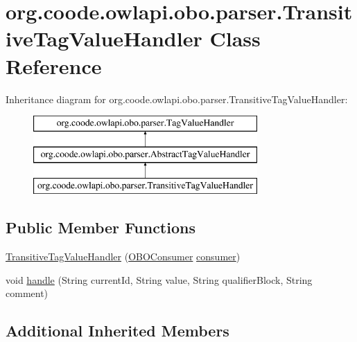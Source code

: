 \hypertarget{classorg_1_1coode_1_1owlapi_1_1obo_1_1parser_1_1_transitive_tag_value_handler}{\section{org.\-coode.\-owlapi.\-obo.\-parser.\-Transitive\-Tag\-Value\-Handler Class Reference}
\label{classorg_1_1coode_1_1owlapi_1_1obo_1_1parser_1_1_transitive_tag_value_handler}
}
Inheritance diagram for org.\-coode.\-owlapi.\-obo.\-parser.\-Transitive\-Tag\-Value\-Handler\-:\begin{figure}[H]
\begin{center}
\leavevmode
\includegraphics[height=3.000000cm]{classorg_1_1coode_1_1owlapi_1_1obo_1_1parser_1_1_transitive_tag_value_handler}
\end{center}
\end{figure}
\subsection*{Public Member Functions}
\begin{DoxyCompactItemize}
\item 
\hyperlink{classorg_1_1coode_1_1owlapi_1_1obo_1_1parser_1_1_transitive_tag_value_handler_a426d4cb0d40fc251f19bee9bec173ab2}{Transitive\-Tag\-Value\-Handler} (\hyperlink{classorg_1_1coode_1_1owlapi_1_1obo_1_1parser_1_1_o_b_o_consumer}{O\-B\-O\-Consumer} \hyperlink{classorg_1_1coode_1_1owlapi_1_1obo_1_1parser_1_1_abstract_tag_value_handler_ab27f1ff22d15640c5f81585f18265137}{consumer})
\item 
void \hyperlink{classorg_1_1coode_1_1owlapi_1_1obo_1_1parser_1_1_transitive_tag_value_handler_ace95c091ba188a4a79622edc48ff0433}{handle} (String current\-Id, String value, String qualifier\-Block, String comment)
\end{DoxyCompactItemize}
\subsection*{Additional Inherited Members}



